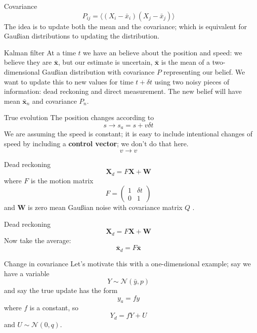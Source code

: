 \documentclass{beamer}
\newcommand{\crish}{\color{reddish}}
\newcommand{\cbla}{\color{black}}
\begin{document}
\begin{frame}{Covariance}
\crish$$
P_{ij}=\langle (X_i-\bar{x}_i)(X_j-\bar{x}_j)\rangle
$$\cbla{}
{The idea is to update both the mean and the covariance; which is
equivalent for Gau\ss{}ian distributions to updating the distribution.}
\end{frame}

\begin{frame}{Kalman filter}
 At a time \crish$t$\cbla{} we have an believe about the position and
 speed: we believe they are \crish$\mathbf{\bar{x}}$\cbla{}, but our
 estimate is uncertain, \crish$\mathbf{\bar{x}}$\cbla{} is the mean of
 a two-dimensional Gau\ss{}ian distribution with covariance
 \crish$P$\cbla{} representing our belief.
\vskip 1cm We want to update this to new values for time
\crish$t+\delta t$\cbla{} using two noisy pieces of information: dead
reckoning and direct measurement. The new belief will have mean
\crish$\mathbf{\bar{x}}_n$\cbla{} and covariance \crish$P_n$\cbla{}.
\end{frame}

\begin{frame}{True evolution}
  The position changes according to
  \crish$$ s\rightarrow s_a =
s+v\delta t
  $$\cbla{}
 We are assuming the speed is constant; it is easy to include intentional changes of speed by including a \textbf{control vector}; we don't do that here.
  \crish$$
  v\rightarrow v
  $$\cbla{}
\end{frame}

\begin{frame}{Dead reckoning}
\crish$$
\mathbf{X}_d=F\mathbf{X}+\mathbf{W}
$$\cbla{}
where \crish$F$\cbla{} is the motion matrix
\crish$$
F=\left(\begin{array}{cc}1&\delta t\\0&1\end{array}\right)
$$\cbla{} and \crish$\mathbf{W}$\cbla{} is zero mean Gau\ss{}ian noise
  with covariance matrix \crish$Q$\cbla{} .
\end{frame}

\begin{frame}{Dead reckoning}
\crish$$ \mathbf{X}_d=F\mathbf{X}+\mathbf{W}
$$\cbla{}
{Now take the average:}
\crish$$
\mathbf{\bar{x}}_d=F\mathbf{\bar{x}}
$$\cbla{}

\end{frame}

\begin{frame}{Change in covariance}
  Let's motivate this with a one-dimensional example; say we have a
  variable
  \crish$$Y\sim\mathcal{N}(\bar{y},p)$$\cbla{}
  {and say the true update has the form} \crish$$y_a=fy
  $$\cbla{} {where \crish$f$\cbla{} is a constant, so
    \crish$$Y_d=fY+U$$\cbla{} and
    \crish$U\sim\mathcal{N}(0,q)$\cbla{}.}
\end{frame}
\end{document}

